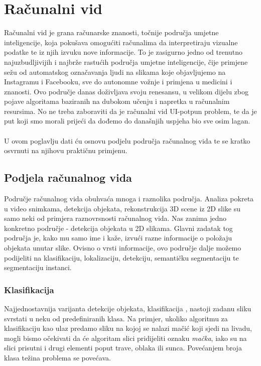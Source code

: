 \chapter{Računalni vid}

Računalni vid  je grana računarske znanosti, točnije područja umjetne inteligencije, koja pokušava omogućiti računalima da interpretiraju  vizualne podatke te iz njih izvuku nove informacije. To je zasigurno jedno od trenutno najuzbudljivijih i najbrže rastućih područja umjetne inteligencije, čije primjene sežu od automatskog označavanja ljudi na slikama koje objavljujemo na Instagramu i Facebooku, sve do autonomne vožnje i primjena u medicini i znanosti. Ovo područje danas doživljava svoju renesansu, u velikom dijelu zbog pojave algoritama baziranih na dubokom učenju i napretka u računalnim resursima. No ne treba zaboraviti da je računalni vid UI-potpun problem, te da je put koji smo morali prijeći da dođemo do današnjih uspjeha bio sve osim lagan.\\ \\
U ovom poglavlju dati ću osnovu podjelu područja računalnog vida te se kratko osvrnuti na njihovu praktičnu primjenu.
\section{Podjela računalnog vida}

Područje računalnog vida obuhvaća mnoga i raznolika područja. Analiza pokreta u video snimkama, detekcija objekata, rekonstrukcija 3D scene iz 2D slike su samo neki od primjera raznovrsnosti računalnog vida. Nas zanima jedno konkretno područje - detekcija objekata u 2D slikama. Glavni zadatak tog područja je, kako mu samo ime i kaže, izvući razne informacije o položaju objekata unutar slike. Ovisno o vrsti informacije, ovo područje dalje možemo podijeliti na klasifikaciju, lokalizaciju, detekciju, semantičku segmentaciju te segmentaciju instanci.

\subsection{Klasifikacija}
Najjednostavnija varijanta detekcije objekata, klasifikacija , nastoji zadanu sliku svrstati u neku od predefiniranih klasa. Na primjer, ukoliko algoritmu za klasifikaciju kao ulaz predamo sliku na kojoj se nalazi mačić koji sjedi na livadu, mogli bismo očekivati da će algoritam slici pridijeliti oznaku \textit{mačka}, iako su na slici prisutni i drugi elementi poput trave, oblaka ili sunca. Povećanjem broja klasa težina problema se povećava. 

